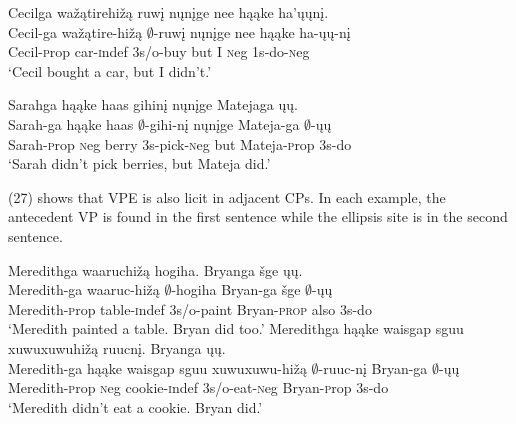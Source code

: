 \documentclass[output=paper]{LSP/langsci}
\begin{document}
\begin{exe}
\ex
\begin{xlist}
\ex
\glll Cecilga wa\v{z}\k{a}tirehi\v{z}\k{a} ruw\k{i} n\k{u}n\k{i}ge nee h\k{a}\k{a}ke ha'\k{u}\k{u}n\k{i}.\\
Cecil-ga wa\v{z}\k{a}tire-hi\v{z}\k{a} $\emptyset$-ruw\k{i} n\k{u}n\k{i}ge nee h\k{a}\k{a}ke ha-\k{u}\k{u}-n\k{i}\\
Cecil-{\textsc prop} car-{\textsc indef} {\textsc 3s/o}-buy but I {\textsc neg} {\textsc 1s}-do-{\textsc neg}\\
\trans `Cecil bought a car, but I didn't.'

\ex
\glll Sarahga h\k{a}\k{a}ke haas gihin\k{i} n\k{u}n\k{i}ge Matejaga \k{u}\k{u}.\\
Sarah-ga h\k{a}\k{a}ke haas $\emptyset$-gihi-n\k{i} n\k{u}n\k{i}ge Mateja-ga $\emptyset$-\k{u}\k{u}\\
Sarah-{\textsc prop} {\textsc neg} berry {\textsc 3s}-pick-{\textsc neg} but Mateja-{\textsc prop} {\textsc 3s}-do\\
\trans `Sarah didn't pick berries, but Mateja did.'
\end{xlist}
\end{exe}


(27) shows that VPE is also licit in adjacent CPs. In each example, the antecedent VP is found in the first sentence while the ellipsis site is in the second sentence.

\begin{exe}
\ex
\begin{xlist}
\ex
\glll Meredithga waaruchi\v{z}\k{a} hogiha. Bryanga \v{s}ge \k{u}\k{u}.\\
Meredith-ga waaruc-hi\v{z}\k{a} $\emptyset$-hogiha Bryan-ga \v{s}ge $\emptyset$-\k{u}\k{u}\\
Meredith-{\textsc prop} table-{\textsc indef} {\textsc 3s/o}-paint Bryan-\textsc{prop} also {\textsc 3s}-do\\
\trans `Meredith painted a table. Bryan did too.'
\ex
\glll Meredithga h\k{a}\k{a}ke {waisgap sguu xuwuxuwuhi\v{z}\k{a}} ruucn\k{i}. Bryanga \k{u}\k{u}.\\
Meredith-ga h\k{a}\k{a}ke {waisgap sguu xuwuxuwu-hi\v{z}\k{a}} $\emptyset$-ruuc-n\k{i} Bryan-ga $\emptyset$-\k{u}\k{u}\\
Meredith-{\textsc prop} {\textsc neg} cookie-{\textsc indef} {\textsc 3s/o}-eat-{\textsc neg} Bryan-{\textsc prop} {\textsc 3s}-do\\
\trans `Meredith didn't eat a cookie. Bryan did.'
\end{xlist}
\end{exe}
\end{document}
